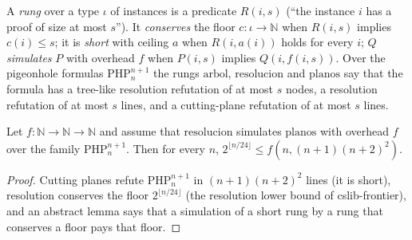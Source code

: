 \begin{definition}
  \label{def:structure-peldano}
  \leanok
  A \emph{rung} over a type $\iota$ of instances is a predicate $R(i, s)$ (``the instance $i$ has a
  proof of size at most $s$''). It \emph{conserves} the floor $c : \iota \to \mathbb{N}$ when $R(i, s)$
  implies $c(i) \le s$; it is \emph{short} with ceiling $a$ when $R(i, a(i))$ holds for every $i$;
  $Q$ \emph{simulates} $P$ with overhead $f$ when $P(i, s)$ implies $Q(i, f(i, s))$. Over the
  pigeonhole formulas $\mathrm{PHP}^{n+1}_n$ the rungs $\mathrm{arbol}$, $\mathrm{resolucion}$ and
  $\mathrm{planos}$ say that the formula has a tree-like resolution refutation of at most $s$
  nodes, a resolution refutation of at most $s$ lines, and a cutting-plane refutation of at most $s$
  lines.
  \own{}
\end{definition}

\begin{theorem}
  \label{thm:structure-separa-resolucion-planos}
  \leanok
  Let $f : \mathbb{N} \to \mathbb{N} \to \mathbb{N}$ and assume that $\mathrm{resolucion}$ simulates
  $\mathrm{planos}$ with overhead $f$ over the family $\mathrm{PHP}^{n+1}_n$. Then for every $n$,
  $2^{\lfloor n/24 \rfloor} \le f(n, (n+1)(n+2)^2)$.
  \own{}
\end{theorem}

\begin{proof}
  \leanok
  Cutting planes refute $\mathrm{PHP}^{n+1}_n$ in $(n+1)(n+2)^2$ lines (it is short), resolution
  conserves the floor $2^{\lfloor n/24 \rfloor}$ (the resolution lower bound of cslib-frontier), and an
  abstract lemma says that a simulation of a short rung by a rung that conserves a floor pays that
  floor.
\end{proof}

